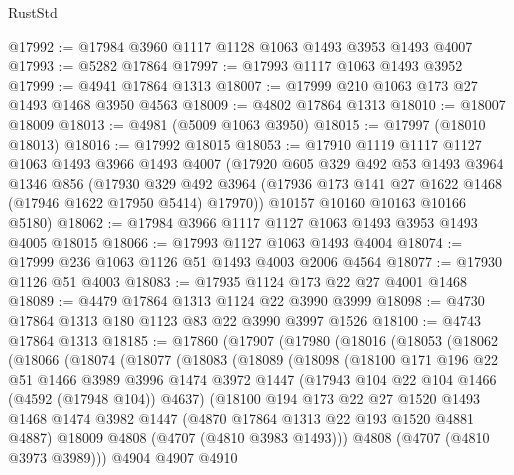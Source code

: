 \begin{lexlean}{RustStd}
\begin{coremodule}
@17992 := @17984 @3960 @1117 @1128 @1063 @1493 @3953 @1493 @4007
@17993 := @5282 @17864
@17997 := @17993 @1117 @1063 @1493 @3952
@17999 := @4941 @17864 @1313
@18007 := @17999 @210 @1063 @173 @27 @1493 @1468 @3950 @4563
@18009 := @4802 @17864 @1313
@18010 := @18007 @18009
@18013 := @4981 (@5009 @1063 @3950)
@18015 := @17997 (@18010 @18013)
@18016 := @17992 @18015
@18053 := @17910
    @1119
    @1117
    @1127
    @1063
    @1493
    @3966
    @1493
    @4007
    (@17920
      @605
      @329
      @492
      @53
      @1493
      @3964
      @1346
      @856
      (@17930 @329 @492 @3964 (@17936 @173 @141 @27 @1622 @1468 (@17946 @1622 @17950 @5414) @17970))
      @10157
      @10160
      @10163
      @10166
      @5180)
@18062 := @17984 @3966 @1117 @1127 @1063 @1493 @3953 @1493 @4005 @18015
@18066 := @17993 @1127 @1063 @1493 @4004
@18074 := @17999 @236 @1063 @1126 @51 @1493 @4003 @2006 @4564
@18077 := @17930 @1126 @51 @4003
@18083 := @17935 @1124 @173 @22 @27 @4001 @1468
@18089 := @4479 @17864 @1313 @1124 @22 @3990 @3999
@18098 := @4730 @17864 @1313 @180 @1123 @83 @22 @3990 @3997 @1526
@18100 := @4743 @17864 @1313
@18185 := @17860
    (@17907
      (@17980
        (@18016
          (@18053
            (@18062
              (@18066
                (@18074
                  (@18077
                    (@18083
                      (@18089
                        (@18098
                          (@18100
                            @171
                            @196
                            @22
                            @51
                            @1466
                            @3989
                            @3996
                            @1474
                            @3972
                            @1447
                            (@17943 @104 @22 @104 @1466 (@4592 (@17948 @104)) @4637)
                            (@18100
                              @194
                              @173
                              @22
                              @27
                              @1520
                              @1493
                              @1468
                              @1474
                              @3982
                              @1447
                              (@4870 @17864 @1313 @22 @193 @1520 @4881 @4887)
                              @18009
                              @4808
                              (@4707 (@4810 @3983 @1493)))
                            @4808
                            (@4707 (@4810 @3973 @3989)))
                          @4904
                          @4907
                          @4910

\end{coremodule}
\end{lexlean}

